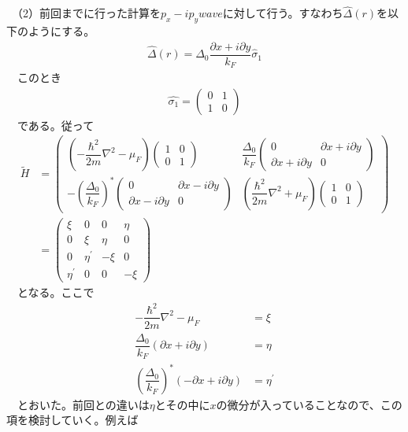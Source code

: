 \documentclass{jarticle}
\begin{document}
　（2）前回までに行った計算を$p_{x}-ip_{y}wave$に対して行う。すなわち$\hat{\Delta}(r)$を以下のようにする。
　\begin{align}
　\hat{\Delta}(r)=\Delta_0\dfrac{\partial x+i\partial y}{k_F}\hat\sigma_1
　\end{align}
　このとき
　 \begin{align}
　\hat{\sigma_1}=
　\begin{pmatrix}
　0 & 1\\
　1 & 0
　\end{pmatrix}
　\end{align}
　である。従って
　    \begin{align}
　\tilde{H}&=
　\begin{pmatrix}
　(-\dfrac{\hbar^2}{2m}\nabla^2-\mu_F)\begin{pmatrix}
　1 & 0 \\
　0 & 1
　\end{pmatrix} & \dfrac{\Delta_0}{k_{F}} \begin{pmatrix}
　0 & \partial x+i\partial y \\
　\partial x+i\partial y & 0
　\end{pmatrix} \\
　-\left(\dfrac{\Delta_0}{k_{F}}\right)^{*}
　\begin{pmatrix}
　0 & \partial x-i\partial y \\
　\partial x-i\partial y& 0
　\end{pmatrix} & (\dfrac{\hbar^2}{2m}\nabla^2+\mu_F)\begin{pmatrix}
　1 & 0 \\
　0 & 1
　\end{pmatrix}
　\end{pmatrix}
　\\&=\begin{pmatrix}
　\xi & 0 & 0 & \eta \\ 
　0 & \xi & \eta & 0 \\ 
　0 & \eta^{'} & -\xi & 0 \\ 
　\eta^{'} & 0 & 0 & -\xi
　\end{pmatrix} 
　\end{align}
　となる。ここで
　\begin{align}
　-\dfrac{\hbar^2}{2m}\nabla^2-\mu_F&=\xi\\
　\dfrac{\Delta_0}{k_{F}}(\partial x+i\partial y)&=\eta\\
　\left(\dfrac{\Delta_0}{k_{F}}\right)^{*}(-\partial x+i\partial y)&=\eta^{'}
　\end{align}
　とおいた。前回との違いは$\eta$とその中に$x$の微分が入っていることなので、この項を検討していく。例えば
\end{document}
